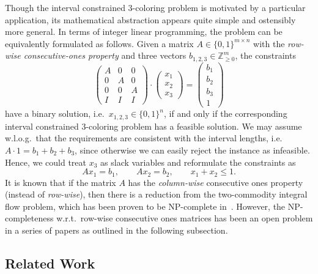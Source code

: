 \documentclass[a4paper,11pt]{article}
\providecommand{\setZ}{\mathbb{Z}}
\theoremstyle{theorem}
\begin{document}
Though the interval constrained 3-coloring problem is motivated by a particular application, its mathematical abstraction appears quite simple and ostensibly more general. In terms of integer linear programming, the problem can be equivalently formulated as follows. Given a matrix $A \in \{0,1\}^{m \times n}$ with the \emph{row-wise consecutive-ones property} and three vectors $b_{1,2,3} \in \setZ_{\ge 0}^m$, the constraints
\begin{equation}
\label{eq}
\begin{pmatrix} 
A & 0 & 0 \\
0 & A & 0 \\
0 & 0 & A \\
I & I & I
\end{pmatrix}
\cdot
\begin{pmatrix}
x_1 \\ x_2 \\ x_3  
\end{pmatrix}
=
\begin{pmatrix}
b_1 \\ b_2 \\ b_3 \\ 1
\end{pmatrix}
\end{equation}
have a binary solution, i.e.~$x_{1,2,3} \in \{0,1\}^n$, if and only if the corresponding interval constrained 3-coloring problem has a feasible solution. We may assume w.l.o.g.~that the requirements are consistent with the interval lengths, i.e.~$A\cdot 1 = b_1 + b_2 + b_3$, since otherwise we can easily reject the instance as infeasible. Hence, we could treat $x_3$ as slack variables and reformulate the constraints as
\begin{equation}\label{eq:packing}
 A x_1 = b_1, \qquad A x_2 = b_2, \qquad x_1 + x_2 \leq 1.
\end{equation}
It is known that if the matrix $A$ has the \emph{column-wise} consecutive ones property (instead of \emph{row-wise}), then there is a reduction from the two-commodity integral flow problem, which has been proven to be NP-complete in~\cite{EIS76}. However, the NP-completeness w.r.t.~row-wise consecutive ones matrices has been an open problem in a series of papers as outlined in the following subsection. 

\subsection{Related Work}
\end{document}
